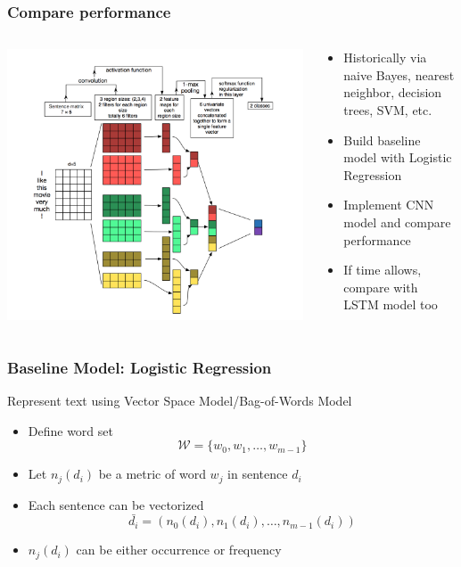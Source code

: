 \documentclass{beamer}
\begin{document}
\begin{frame}
\frametitle{Compare performance}
    \begin{columns}
    \begin{column}{0.5\textwidth}
    \center\includegraphics[width=\textwidth]{figure/sc_cnn}
    \end{column}
    \begin{column}{0.5\textwidth}
    \begin{itemize}
        \item Historically via naive Bayes, nearest neighbor, decision trees, SVM, etc.
        \item Build baseline model with Logistic Regression
        \item Implement CNN model and compare performance
        \item If time allows, compare with LSTM model too
    \end{itemize}
    \end{column}
    \end{columns}
\end{frame}

\begin{frame}
\frametitle{Baseline Model: Logistic Regression}
    Represent text using Vector Space Model/Bag-of-Words Model
    \begin{itemize}
        \item Define word set $$\mathcal{W}=\{w_0, w_1,\ldots, w_{m-1}\}$$
        \item Let $n_j(d_i)$ be a metric of word $w_j$ in sentence $d_i$
        \item Each sentence can be vectorized
        $$\bar{d_i}=(n_0(d_i),n_1(d_i),\ldots,n_{m-1}(d_i))$$
        \item $n_j(d_i)$ can be either occurrence or frequency
    \end{itemize}
\end{frame}
\end{document}

